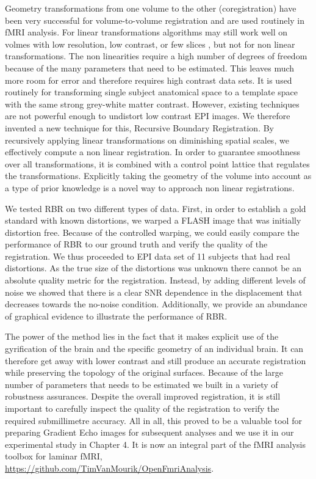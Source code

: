 Geometry transformations from one volume to the other (coregistration) have been very successful for volume-to-volume registration and are used routinely in fMRI analysis. For linear transformations algorithms may still work well on volmes with low resolution, low contrast, or few slices \cite{Greve201}, but not for non linear transformations. The non linearities require a high number of degrees of freedom because of the many parameters that need to be estimated. This leaves much more room for error and therefore requires high contrast data sets. It is used routinely for transforming single subject anatomical space to a template space with the same strong grey-white matter contrast. However, existing techniques are not powerful enough to undistort low contrast EPI images. We therefore invented a new technique for this, Recursive Boundary Registration. By recursively applying linear transformations on diminishing spatial scales, we effectively compute a non linear registration. In order to guarantee smoothness over all transformations, it is combined with a control point lattice that regulates the transformations. Explicitly taking the geometry of the volume into account as a type of prior knowledge is a novel way to approach non linear registrations.

We tested RBR on two different types of data. First, in order to establish a gold standard with known distortions, we warped a FLASH image that was initially distortion free. Because of the controlled warping, we could easily compare the performance of RBR to our ground truth and verify the quality of the registration. We thus proceeded to EPI data set of 11 subjects that had real distortions. As the true size of the distortions was unknown there cannot be an absolute quality metric for the registration. Instead, by adding different levels of noise we showed that there is a clear SNR dependence in the displacement that decreases towards the no-noise condition. Additionally, we provide an abundance of graphical evidence to illustrate the performance of RBR.

The power of the method lies in the fact that it makes explicit use of the gyrification of the brain and the specific geometry of an individual brain. It can therefore get away with lower contrast and still produce an accurate registration while preserving the topology of the original surfaces. Because of the large number of parameters that needs to be estimated we built in a variety of robustness assurances. Despite the overall improved registration, it is still important to carefully inspect the quality of the registration to verify the required submillimetre accuracy. All in all, this proved to be a valuable tool for preparing Gradient Echo images for subsequent analyses and we use it in our experimental study in Chapter 4. It is now an integral part of the fMRI analysis toolbox for laminar fMRI, \url{https://github.com/TimVanMourik/OpenFmriAnalysis}.

